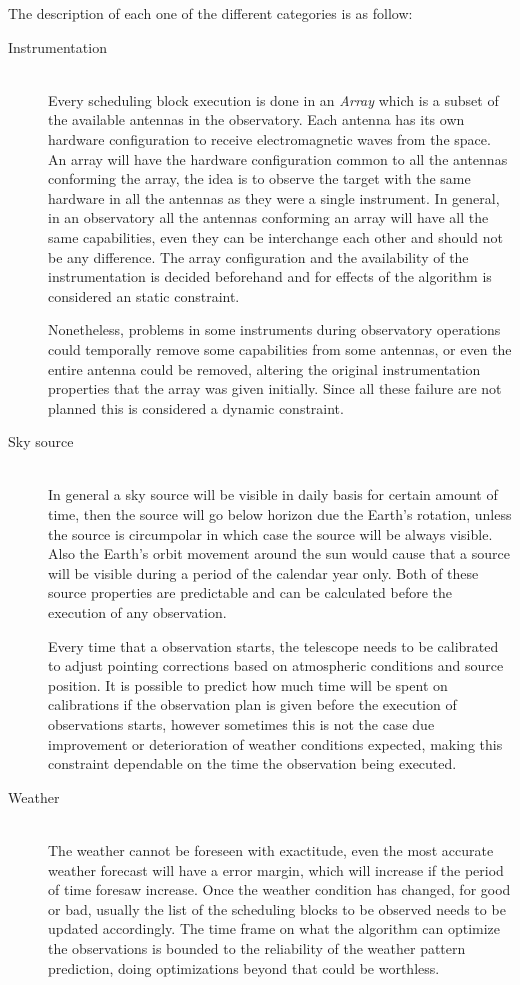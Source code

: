 The description of each one of the different categories is as follow:

\begin{description}
    \item[Instrumentation] \hfill \\
Every scheduling block execution is done in an \textit{Array} which is a subset of the available antennas in the observatory. Each antenna has its own hardware configuration to receive electromagnetic waves from the space. An array will have the hardware configuration common to all the antennas conforming the array, the idea is to observe the target with the same hardware in all the antennas as they were a single instrument. In general, in an observatory all the antennas conforming an array will have all the same capabilities, even they can be interchange each other and should not be any difference. The array configuration and the availability of the instrumentation is decided beforehand and for effects of the algorithm is considered an static constraint. 

Nonetheless, problems in some instruments during observatory operations could temporally remove some capabilities from some antennas, or even the entire antenna could be removed, altering the original instrumentation properties that the array was given initially. Since all these failure are not planned this is considered a dynamic constraint.

	\item[Sky source] \hfill \\
In general a sky source will be visible in daily basis for certain amount of time, then the source will go below horizon due the Earth's rotation, unless the source is circumpolar in which case the source will be always visible. Also the Earth's orbit movement around the sun would cause that a source will be visible during a period of the calendar year only. Both of these source properties are predictable and can be calculated before the execution of any observation.

Every time that a observation starts, the telescope needs to be calibrated to adjust pointing corrections based on atmospheric conditions and source position. It is possible to predict how much time will be spent on calibrations if the observation plan is given before the execution of observations starts, however sometimes this is not the case due improvement or deterioration of weather conditions expected, making this constraint dependable on the time the observation being executed.
  
	\item[Weather] \hfill \\
The weather cannot be foreseen with exactitude, even the most accurate weather forecast will have a error margin, which will increase if the period of time foresaw increase. Once the weather condition has changed, for good or bad, usually the list of the scheduling blocks to be observed needs to be updated accordingly. The time frame on what the algorithm can optimize the observations is bounded to the reliability of the weather pattern prediction, doing optimizations beyond that could be worthless.

\end{description}

